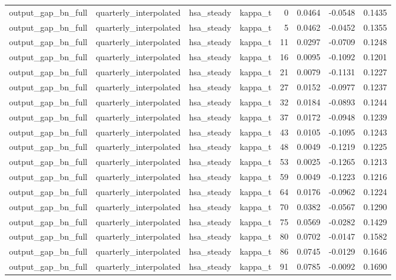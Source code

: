 \begin{tabular}{llllrrrr}
output\_gap\_bn\_full & quarterly\_interpolated & hsa\_steady & kappa\_t & 0 & 0.0464 & -0.0548 & 0.1435 \\
output\_gap\_bn\_full & quarterly\_interpolated & hsa\_steady & kappa\_t & 5 & 0.0462 & -0.0452 & 0.1355 \\
output\_gap\_bn\_full & quarterly\_interpolated & hsa\_steady & kappa\_t & 11 & 0.0297 & -0.0709 & 0.1248 \\
output\_gap\_bn\_full & quarterly\_interpolated & hsa\_steady & kappa\_t & 16 & 0.0095 & -0.1092 & 0.1201 \\
output\_gap\_bn\_full & quarterly\_interpolated & hsa\_steady & kappa\_t & 21 & 0.0079 & -0.1131 & 0.1227 \\
output\_gap\_bn\_full & quarterly\_interpolated & hsa\_steady & kappa\_t & 27 & 0.0152 & -0.0977 & 0.1237 \\
output\_gap\_bn\_full & quarterly\_interpolated & hsa\_steady & kappa\_t & 32 & 0.0184 & -0.0893 & 0.1244 \\
output\_gap\_bn\_full & quarterly\_interpolated & hsa\_steady & kappa\_t & 37 & 0.0172 & -0.0948 & 0.1239 \\
output\_gap\_bn\_full & quarterly\_interpolated & hsa\_steady & kappa\_t & 43 & 0.0105 & -0.1095 & 0.1243 \\
output\_gap\_bn\_full & quarterly\_interpolated & hsa\_steady & kappa\_t & 48 & 0.0049 & -0.1219 & 0.1225 \\
output\_gap\_bn\_full & quarterly\_interpolated & hsa\_steady & kappa\_t & 53 & 0.0025 & -0.1265 & 0.1213 \\
output\_gap\_bn\_full & quarterly\_interpolated & hsa\_steady & kappa\_t & 59 & 0.0049 & -0.1223 & 0.1216 \\
output\_gap\_bn\_full & quarterly\_interpolated & hsa\_steady & kappa\_t & 64 & 0.0176 & -0.0962 & 0.1224 \\
output\_gap\_bn\_full & quarterly\_interpolated & hsa\_steady & kappa\_t & 70 & 0.0382 & -0.0567 & 0.1290 \\
output\_gap\_bn\_full & quarterly\_interpolated & hsa\_steady & kappa\_t & 75 & 0.0569 & -0.0282 & 0.1429 \\
output\_gap\_bn\_full & quarterly\_interpolated & hsa\_steady & kappa\_t & 80 & 0.0702 & -0.0147 & 0.1582 \\
output\_gap\_bn\_full & quarterly\_interpolated & hsa\_steady & kappa\_t & 86 & 0.0745 & -0.0129 & 0.1646 \\
output\_gap\_bn\_full & quarterly\_interpolated & hsa\_steady & kappa\_t & 91 & 0.0785 & -0.0092 & 0.1690 \\

\end{tabular}
